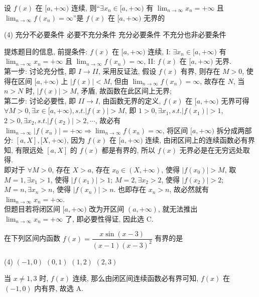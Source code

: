 \begin{example}
    设 $f(x)$ 在 $[a,+\infty)$ 连续, 则“$\exists x_n\in[a,+\infty)$ 有 $\displaystyle \lim_{n \to \infty}x_n=+\infty $ 且 $\displaystyle \lim_{n \to \infty}f(x_n)=\infty$”是 $f(x)$ 在 $[a,+\infty)$ 无界的 
    \begin{tasks}(4)
        \task 充分不必要条件
        \task 必要不充分条件
        \task 充分必要条件
        \task 不充分也非必要条件
    \end{tasks}
\end{example}
\begin{solution}
    提炼题目的信息, 前提条件: $f(x)$ 在 $[a,+\infty)$ 连续, I: $\exists x_n\in[a,+\infty)$ 有 $\displaystyle \lim_{n \to \infty}x_n=+\infty $ 且 $\displaystyle \lim_{n \to \infty}f(x_n)=\infty$, II: $f(x)$ 在 $[a,+\infty)$ 无界.\\
    第一步: 讨论充分性, 即 $I\rightarrow II$, 采用反证法, 假设 $f(x)$ 有界, 则存在 $M>0$, 使得在区间 $[a,+\infty)$ 上 $|f(x)|<M$, 但由 $\displaystyle \lim_{n \to \infty}f(x_n)=\infty$, 故存在 $N$, 当 $n>N$ 时, $|f(x)|>M$, 矛盾, 故函数在此区间上无界;\\ 
    第二步: 讨论必要性, 即 $II\rightarrow I$, 由函数无界的定义, $f(x)$ 在 $[a,+\infty)$ 无界可得 $\forall M>0,\exists x\in[a,+\infty),s.t.|f(x)|>M$, 即 $1>0,\exists x_1,s.t.|f(x_1)|>1$, $2>0,\exists x_2,s.t.|f(x_2)|>2, \cdots $, 故必有 $\displaystyle \lim_{n \to \infty}|f(x_n)|=+\infty\Rightarrow \lim_{n \to \infty}f(x_n)=\infty$, 将区间 $ [a,+\infty) $ 拆分成两部分: $ [a, X], [X,+\infty) $, 因为 $ f(x) $ 在 $ [a,+\infty) $ 连续, 由闭区间上的连续函数必有界知, 有限远处 $ [a, X] $ 的 $ f(x) $ 都是有界的, 所以 $ f(x) $ 无界必是在无穷远处取得.\\ 
    即对于 $ \forall M>0 $, 存在 $ X>a $, 存在 $ x_{0} \in(X,+\infty) $, 使得 $ \left|f\left(x_{0}\right)\right|>M $, 
    取 $ M=1,\exists x_{1}>1 $, 使得 $ \left|f\left(x_{1}\right)\right|>1 $; $M=2, \exists x_{2}>2 $, 使得 $ \left|f\left(x_{2}\right)\right|>2 $; $M=n, \exists x_{n}>n $, 使得 $ \left|f\left(x_{n}\right)\right|>n $. 也即存在 $ x_{n}>n $, 故必然就有 $\displaystyle  \lim _{n \rightarrow \infty} x_{n}=+\infty $.\\ 
    但题目若将闭区间 $ [a,+\infty) $ 改为开区间 $ (a,+\infty) $, 就无法推出 $\displaystyle  \lim _{n \rightarrow \infty} x_{n}=+\infty $ 了, 即必要性得证, 因此选 C.
\end{solution}

\begin{example}
    在下列区间内函数 $f(x)=\dfrac{x \sin (x-3)}{(x-1)(x-3)^2}$ 有界的是
    \begin{tasks}(4)
        \task $(-1,0)$
        \task $(0,1)$
        \task $(1,2)$
        \task $(2,3)$
    \end{tasks}
\end{example}
\begin{solution}
    当 $x \neq 1,3$ 时, $f(x)$ 连续, 那么由闭区间连续函数必有界可知, $f(x)$ 在 $(-1,0)$ 内有界, 故选 A.
\end{solution}

